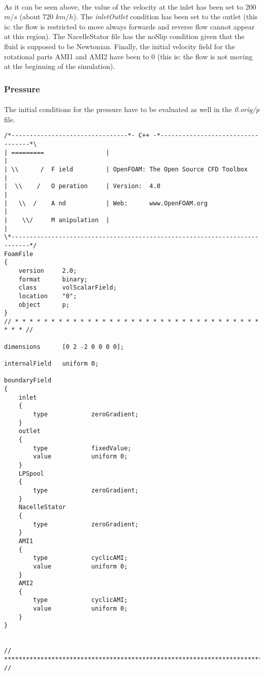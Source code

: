 \paragraph{}As it can be seen above, the value of the velocity at the inlet has been set to 200 $m/s$ (about 720 $km/h$). The \textit{inletOutlet} condition has been set to the outlet (this is: the flow is restricted to move always forwards and reverse flow cannot appear at this region). The NacelleStator file has the noSlip condition given that the fluid is supposed to be Newtonian. Finally, the initial velocity field for the rotational parts AMI1 and AMI2 have been to 0 (this is: the flow is not moving at the beginning of the simulation).

\subsubsection{Pressure}

\paragraph{}The initial conditions for the pressure have to be evaluated as well in the \textit{0.orig/p} file.

\begin{footnotesize}
\begin{verbatim}
/*--------------------------------*- C++ -*----------------------------------*\
| =========                 |                                                 |
| \\      /  F ield         | OpenFOAM: The Open Source CFD Toolbox           |
|  \\    /   O peration     | Version:  4.0                                   |
|   \\  /    A nd           | Web:      www.OpenFOAM.org                      |
|    \\/     M anipulation  |                                                 |
\*---------------------------------------------------------------------------*/
FoamFile
{
    version     2.0;
    format      binary;
    class       volScalarField;
    location    "0";
    object      p;
}
// * * * * * * * * * * * * * * * * * * * * * * * * * * * * * * * * * * * * * //

dimensions      [0 2 -2 0 0 0 0];

internalField   uniform 0;

boundaryField
{
    inlet
    {
        type            zeroGradient;
    }
    outlet
    {
        type            fixedValue;
        value           uniform 0;
    }
    LPSpool
    {
        type            zeroGradient;
    }
    NacelleStator
    {
        type            zeroGradient;
    }
    AMI1
    {
        type            cyclicAMI;
        value           uniform 0;
    }
    AMI2
    {
        type            cyclicAMI;
        value           uniform 0;
    }
}


// ************************************************************************* //
\end{verbatim}
\end{footnotesize}